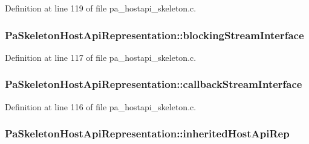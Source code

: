 Definition at line 119 of file pa\+\_\+hostapi\+\_\+skeleton.\+c.

\subsubsection[{\texorpdfstring{blocking\+Stream\+Interface}{blockingStreamInterface}}]{ Pa\+Skeleton\+Host\+Api\+Representation\+::blocking\+Stream\+Interface}\hypertarget{struct_pa_skeleton_host_api_representation_adef5e514ad78efef79811721e50db7c5}{}\label{struct_pa_skeleton_host_api_representation_adef5e514ad78efef79811721e50db7c5}


Definition at line 117 of file pa\+\_\+hostapi\+\_\+skeleton.\+c.

\subsubsection[{\texorpdfstring{callback\+Stream\+Interface}{callbackStreamInterface}}]{ Pa\+Skeleton\+Host\+Api\+Representation\+::callback\+Stream\+Interface}\hypertarget{struct_pa_skeleton_host_api_representation_ae06becb0e8e6a0d5014d6d8530d66051}{}\label{struct_pa_skeleton_host_api_representation_ae06becb0e8e6a0d5014d6d8530d66051}


Definition at line 116 of file pa\+\_\+hostapi\+\_\+skeleton.\+c.

\subsubsection[{\texorpdfstring{inherited\+Host\+Api\+Rep}{inheritedHostApiRep}}]{ Pa\+Skeleton\+Host\+Api\+Representation\+::inherited\+Host\+Api\+Rep}\hypertarget{struct_pa_skeleton_host_api_representation_a3ec480f69783358b33c2aacd7fd6c5de}{}\label{struct_pa_skeleton_host_api_representation_a3ec480f69783358b33c2aacd7fd6c5de}



